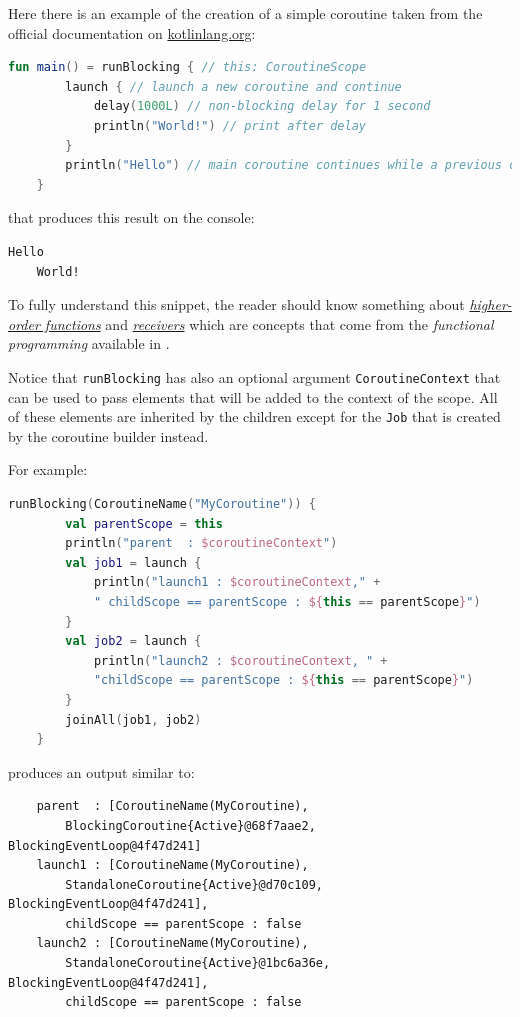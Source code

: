 Here there is an example of the creation of a simple coroutine taken from the official documentation on \href{https://kotlinlang.org/docs/coroutines-basics.html#your-first-coroutine}{kotlinlang.org}:
\begin{lstlisting}[language=kotlin]
	fun main() = runBlocking { // this: CoroutineScope
		launch { // launch a new coroutine and continue
			delay(1000L) // non-blocking delay for 1 second
			println("World!") // print after delay
		}
		println("Hello") // main coroutine continues while a previous one is delayed
	}
\end{lstlisting}

that produces this result on the console:
\begin{lstlisting}[numbers=none]
	Hello
	World!
\end{lstlisting}

To fully understand this snippet, the reader should know something about \href{https://kotlinlang.org/docs/lambdas.html#higher-order-functions}{\textit{higher-order functions}} and \href{https://kotlinlang.org/docs/lambdas.html#function-types}{\textit{receivers}} which are concepts that come from the \textit{functional programming} available in \Kotlin.

Notice that \texttt{runBlocking} has also an optional argument \texttt{CoroutineContext} that can be used to pass elements that will be added to the context of the scope. All of these elements are inherited by the children except for the \texttt{Job} that is created by the coroutine builder instead.

For example:
\begin{lstlisting}[language=Kotlin]
	runBlocking(CoroutineName("MyCoroutine")) {
		val parentScope = this
		println("parent  : $coroutineContext")
		val job1 = launch {
			println("launch1 : $coroutineContext," +
			" childScope == parentScope : ${this == parentScope}")
		}
		val job2 = launch {
			println("launch2 : $coroutineContext, " +
			"childScope == parentScope : ${this == parentScope}")
		}
		joinAll(job1, job2)
	}
\end{lstlisting}
produces an output similar to:
\begin{Verbatim}
	parent  : [CoroutineName(MyCoroutine),
		BlockingCoroutine{Active}@68f7aae2, BlockingEventLoop@4f47d241]
	launch1 : [CoroutineName(MyCoroutine),
		StandaloneCoroutine{Active}@d70c109, BlockingEventLoop@4f47d241],
		childScope == parentScope : false
	launch2 : [CoroutineName(MyCoroutine),
		StandaloneCoroutine{Active}@1bc6a36e, BlockingEventLoop@4f47d241],
		childScope == parentScope : false
\end{Verbatim}

